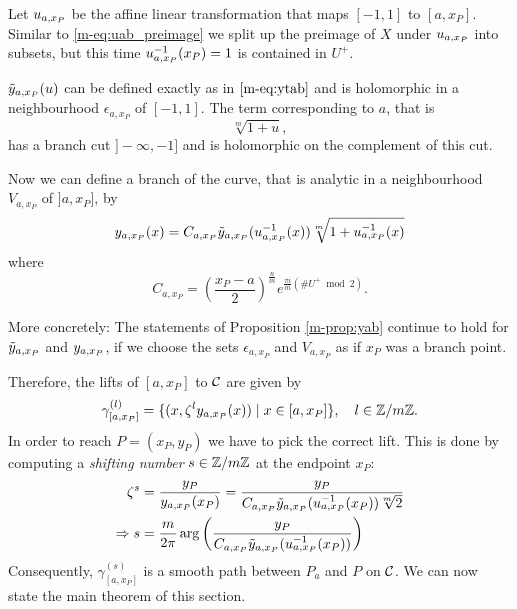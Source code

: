 \documentclass[main.tex]{subfiles}
\begin{document}
  Let  $u_{a,x_P}$ be the affine linear transformation
  that maps $[-1,1]$ to $[a,x_P]$. Similar to \eqref{m-eq:uab_preimage} we split up the preimage of $X$ under $u_{a,x_P}$ into subsets, but this time
 $u_{a,x_P}^{-1}(x_P) = 1$ is contained in $U^+$.
 
  $\tilde{y}_{a,x_P}(u)$ can be defined exactly as in $\eqref{m-eq:ytab}$ and
  is holomorphic in a neighbourhood $\epsilon_{a,x_P}$ of $[-1,1]$.
  The term corresponding to $a$, that is
  \begin{equation}
   \sqrt[m]{1+u},
  \end{equation}
   has a branch cut $]-\infty,-1]$ and is holomorphic on the complement of this cut.
   
  Now we can define a branch of the curve,
   that is analytic in a neighbourhood $V_{a,x_P}$ of $]a,x_P]$, by
  \begin{equation}
    y_{a,x_P}(x) =   C_{a,x_P} \tilde{y}_{a,x_P}( u_{a,x_P}^{-1}(x) ) \sqrt[m]{1 + u_{a,x_P}^{-1}(x)}
  \end{equation}
  where 
   \begin{equation}
      C_{a,x_P} = \left(\frac{x_P-a}{2}\right)^{\frac{n}{m}} e^{\frac{\pi i}{m}(\#U^+ \bmod 2)}.
  \end{equation}
  
  More concretely: The statements of Proposition \ref{m-prop:yab} continue to hold for $\tilde{y}_{a,x_P}$ and $y_{a,x_P}$, 
  if we choose the sets $\epsilon_{a,x_P}$ and $V_{a,x_P}$ as if $x_P$ was a branch point.
  
  Therefore, the lifts of $[a,x_P]$ to $\mathcal{C}$ are given by
    \begin{equation}\label{eq:def_path_axp}
      \gamma^{(l)}_{[a,x_P]} = \{  (x,\zeta^l y_{a,x_P}(x))  \mid  x \in [a,x_P]  \}, \quad l \in \mathbb{Z}/m\mathbb{Z}.
   \end{equation}
  In order to reach $P = (x_P,y_P)$ we have to pick the correct lift. This is done by computing a \emph{shifting number} $s \in \mathbb{Z}/m\mathbb{Z}$ at the endpoint $x_P$:
  \begin{align}
   \zeta^s & = \frac{y_P}{y_{a,x_P}(x_P)} = \frac{y_P}{ C_{a,x_P} \tilde{y}_{a,x_P}( u_{a,x_P}^{-1}(x_P) ) \sqrt[m]{2}  } \\
   \Rightarrow s & = \frac{m}{2\pi} \arg\left(  \frac{y_P}{C_{a,x_P} \tilde{y}_{a,x_P}( u_{a,x_P}^{-1}(x_P) )} \right)
  \end{align}
  Consequently, $\gamma^{(s)}_{[a,x_P]}$ is a smooth path between $P_a$ and $P$ on $\mathcal{C}$. We can now state the main theorem of this section.
  
\end{document}
